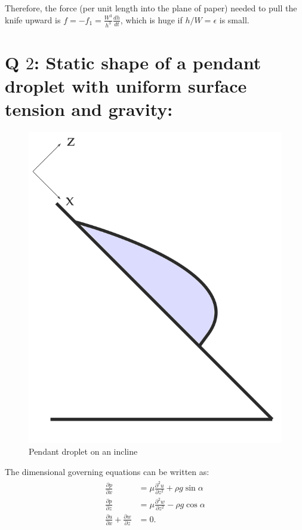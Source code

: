 \documentclass{article}
\begin{document}
Therefore, the force (per unit length into the plane of paper) needed to pull the knife upward is $f = -f_{1} = \frac{W^{3}}{h^{3}}\frac{dh}{dt}$, which is huge if $h/W = \epsilon$ is small.

\section{Q $2$:  Static shape of a pendant droplet with uniform surface tension and gravity:}
\begin{figure}[H]
    \centering
    \includegraphics[scale = 0.2]{Figs/pendant_droplet_incline.png}
    \caption{Pendant droplet on an incline}
    \label{fig:pendant_droplet}
\end{figure}
The dimensional governing equations can be written as:
\begin{align}\label{eq:pendant_gov_eqns_dim}
 \begin{split}
  \frac{\partial p}{\partial x} &= \mu \frac{\partial^{2} u}{\partial z^{2}} + \rho g \sin{\alpha}\\
  \frac{\partial p}{\partial z} &= \mu \frac{\partial^{2} w}{\partial z^{2}} - \rho g \cos{\alpha}\\
  \frac{\partial u}{\partial x} + \frac{\partial w}{\partial z} &= 0.
 \end{split}
\end{align}
\end{document}
